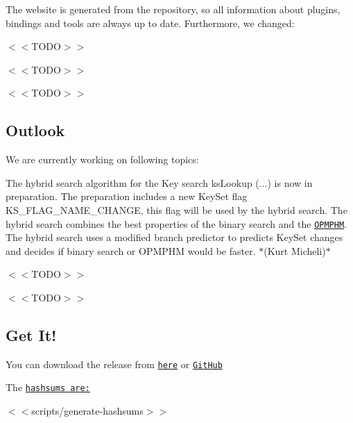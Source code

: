 The website is generated from the repository, so all information about plugins, bindings and tools are always up to date. Furthermore, we changed\+:


\begin{DoxyItemize}
\item $<$$<$\+T\+O\+D\+O$>$$>$
\item $<$$<$\+T\+O\+D\+O$>$$>$
\item $<$$<$\+T\+O\+D\+O$>$$>$
\end{DoxyItemize}

\subsection*{Outlook}

We are currently working on following topics\+:


\begin{DoxyItemize}
\item The hybrid search algorithm for the Key search {\ttfamily ks\+Lookup (...)} is now in preparation. The preparation includes a new Key\+Set flag {\ttfamily K\+S\+\_\+\+F\+L\+A\+G\+\_\+\+N\+A\+M\+E\+\_\+\+C\+H\+A\+N\+GE}, this flag will be used by the hybrid search. The hybrid search combines the best properties of the binary search and the \href{https://master.libelektra.org/doc/dev/data-structures.md#order-preserving-minimal-perfect-hash-map-aka-opmphm}{\tt O\+P\+M\+P\+HM}. The hybrid search uses a modified branch predictor to predicts Key\+Set changes and decides if binary search or O\+P\+M\+P\+HM would be faster. $\ast$(Kurt Micheli)$\ast$
\item $<$$<$\+T\+O\+D\+O$>$$>$
\item $<$$<$\+T\+O\+D\+O$>$$>$
\end{DoxyItemize}

\subsection*{Get It!}

You can download the release from \href{https://www.libelektra.org/ftp/elektra/releases/elektra-0.8.24.tar.gz}{\tt here} or \href{https://github.com/ElektraInitiative/ftp/blob/master/releases/elektra-0.8.24.tar.gz?raw=true}{\tt Git\+Hub}

The \href{https://github.com/ElektraInitiative/ftp/blob/master/releases/elektra-0.8.24.tar.gz.hashsum?raw=true}{\tt hashsums are\+:}

$<$$<${\ttfamily scripts/generate-\/hashsums}$>$$>$

